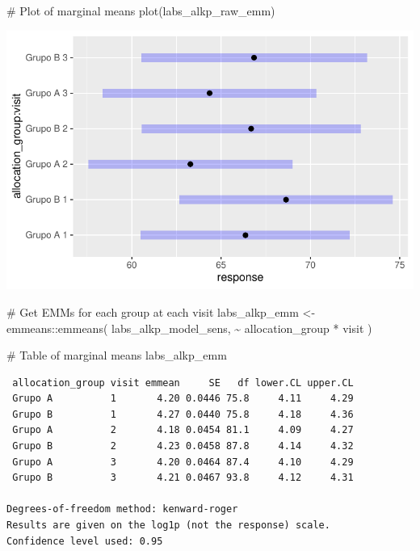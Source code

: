 \documentclass[
  letterpaper,
  DIV=11,
  numbers=noendperiod]{scrartcl}
\newenvironment{Shaded}{\begin{snugshade}}{\end{snugshade}}
\newcommand{\CommentTok}[1]{\textcolor[rgb]{0.37,0.37,0.37}{#1}}
\newcommand{\FunctionTok}[1]{\textcolor[rgb]{0.28,0.35,0.67}{#1}}
\newcommand{\NormalTok}[1]{\textcolor[rgb]{0.00,0.23,0.31}{#1}}
\newcommand{\OtherTok}[1]{\textcolor[rgb]{0.00,0.23,0.31}{#1}}
\newcommand{\SpecialCharTok}[1]{\textcolor[rgb]{0.37,0.37,0.37}{#1}}
\begin{document}
\begin{Shaded}
\begin{Highlighting}[]
\CommentTok{\# Plot of marginal means}
\FunctionTok{plot}\NormalTok{(labs\_alkp\_raw\_emm)}
\end{Highlighting}
\end{Shaded}

\includegraphics{Outcomes_V1V2V3_files/figure-pdf/labs_alkp_raw_emm-1.pdf}

\begin{Shaded}
\begin{Highlighting}[]
\CommentTok{\# Get EMMs for each group at each visit}
\NormalTok{labs\_alkp\_emm }\OtherTok{\textless{}{-}}\NormalTok{ emmeans}\SpecialCharTok{::}\FunctionTok{emmeans}\NormalTok{(}
\NormalTok{    labs\_alkp\_model\_sens, }
    \SpecialCharTok{\textasciitilde{}}\NormalTok{ allocation\_group }\SpecialCharTok{*}\NormalTok{ visit}
\NormalTok{)}

\CommentTok{\# Table of marginal means}
\NormalTok{labs\_alkp\_emm}
\end{Highlighting}
\end{Shaded}

\begin{verbatim}
 allocation_group visit emmean     SE   df lower.CL upper.CL
 Grupo A          1       4.20 0.0446 75.8     4.11     4.29
 Grupo B          1       4.27 0.0440 75.8     4.18     4.36
 Grupo A          2       4.18 0.0454 81.1     4.09     4.27
 Grupo B          2       4.23 0.0458 87.8     4.14     4.32
 Grupo A          3       4.20 0.0464 87.4     4.10     4.29
 Grupo B          3       4.21 0.0467 93.8     4.12     4.31

Degrees-of-freedom method: kenward-roger 
Results are given on the log1p (not the response) scale. 
Confidence level used: 0.95 
\end{verbatim}
\end{document}
